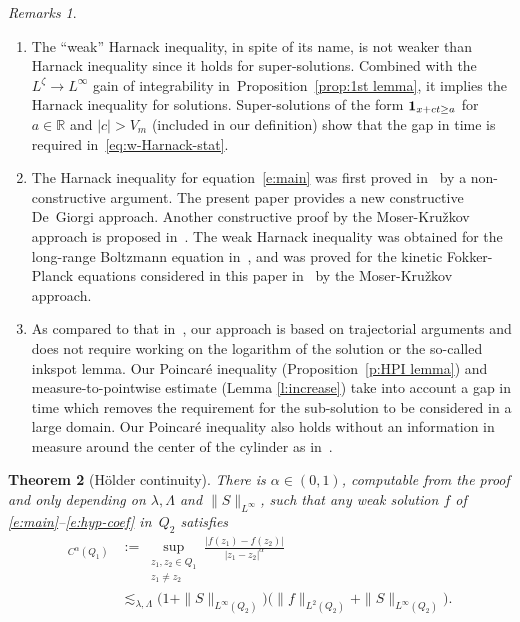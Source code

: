 \documentclass[10pt]{amsart}
\newtheorem{theorem}{Theorem}
\theoremstyle{definition}
\theoremstyle{remark}
\newtheorem{remarks}[theorem]{Remarks}
\begin{document}
\skpt
\begin{remarks}
\begin{enumerate}
\item The ``weak'' Harnack inequality, in spite of its name, is
not weaker than Harnack inequality since it holds for
super-solutions. Combined with the $L^{\zeta} \to L^\infty$
gain of integrability in~Proposition~\ref{prop:1st lemma}, it
implies the Harnack inequality for solutions. Super-solutions
of the form ${\bf 1}_{x+ct\ge a}$ for $a\in \mathbb{R}$ and
$|c|>V_m$ (included in our definition) show that the gap in
time is required in~\eqref{eq:w-Harnack-stat}.
\item The Harnack inequality for equation~\eqref{e:main} was
first proved in~\cite{gimv} by a non-constructive argument. The
present paper provides a new constructive De~Giorgi
approach. Another constructive proof by the Moser-Kru\v{z}kov
approach is proposed in~\cite{Guerand-Imbert}. The weak Harnack
inequality was obtained for the long-range Boltzmann equation
in~\cite{MR4049224}, and was proved for the kinetic
Fokker-Planck equations considered in this paper
in~\cite{Guerand-Imbert} by the Moser-Kru\v{z}kov approach.
\item As compared to that in~\cite{Guerand-Imbert}, our approach
is based on trajectorial arguments and does not require working
on the logarithm of the solution or the so-called inkspot
lemma. Our Poincaré inequality (Proposition~\ref{p:HPI
lemma}) and measure-to-pointwise estimate (Lemma
\ref{l:increase}) take into account a gap in time which removes
the requirement for the sub-solution to be considered in a
large domain. Our Poincaré inequality also holds without an
information in measure around the center of the cylinder as
in~\cite{Guerand-Imbert}.
\end{enumerate}
\end{remarks}

\begin{theorem}[Hölder continuity]
\label{t:holder}
There is $\alpha \in (0,1)$, computable from the proof and only
depending on $\lambda, \Lambda$ and $\|S\|_{L^{\infty}}$, such
that any weak solution $f$ of \eqref{e:main}--\eqref{e:hyp-coef}
in~$Q_2$ satisfies\vspace*{-3pt}
\begin{align*}
[f]_{C^\alpha (Q_{1})}
& := \sup_{\substack{z_1,z_2 \in Q_1\\ z_1 \not =
z_2}} \frac{|f(z_1) - f(z_2)|}{|z_1-z_2|^{\alpha}} \\
& \lesssim_{\lambda,\Lambda}
\bigl(1+\|S\|_{L^\infty(Q_2)} \bigr)
\bigl( \|f\|_{L^2 (Q_2)} + \|S\|_{L^\infty(Q_2)} \bigr).
\end{align*}
\end{theorem}
\end{document}
